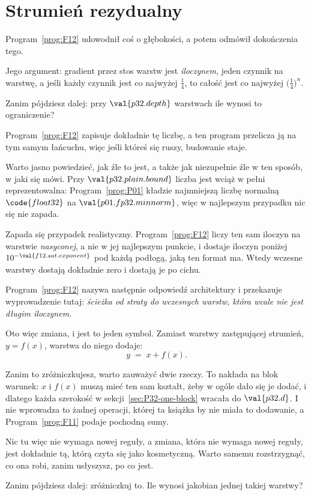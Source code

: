 \section{Strumień rezydualny}
\label{sec:P32-residual}

\begin{fr}
Program~\ref{prog:F12} udowodnił coś o głębokości, a potem odmówił dokończenia
tego.

Jego argument: gradient przez stos warstw jest \emph{iloczynem}, jeden
czynnik na warstwę, a jeśli każdy czynnik jest co najwyżej $\frac{1}{4}$, to
całość jest co najwyżej $\bigl(\frac{1}{4}\bigr)^{n}$.

Zanim pójdziesz dalej: przy $\val{p32.depth}$ warstwach ile wynosi to
ograniczenie?
\dotline
\nextframe
\end{fr}

\begin{fr}

Program~\ref{prog:F12} zapisuje dokładnie tę liczbę, a ten program przelicza
ją na tym samym łańcuchu, więc jeśli któreś się ruszy, budowanie staje.

Warto jasno powiedzieć, jak źle to jest, a także jak niezupełnie źle w ten
sposób, w jaki się mówi. Przy $\val{p32.plain.bound}$ liczba jest wciąż w
pełni reprezentowalna: Program~\ref{prog:P01} kładzie najmniejszą liczbę
normalną $\code{float32}$ na $\val{p01.fp32.minnorm}$, więc w najlepszym
przypadku nic się nie zapada.

Zapada się przypadek realistyczny. Program~\ref{prog:F12} liczy ten sam
iloczyn na warstwie \emph{nasyconej}, a nie w jej najlepszym punkcie, i
dostaje iloczyn poniżej $10^{-\val{f12.sat.exponent}}$ \dash{} pod każdą
podłogą, jaką ten format ma. Wtedy wczesne warstwy dostają dokładnie zero i
dostają je po cichu.

Program~\ref{prog:F12} nazywa następnie odpowiedź architektury i przekazuje
wyprowadzenie tutaj: \emph{ścieżka od straty do wczesnych warstw, która wcale
nie jest długim iloczynem.}

Oto więc zmiana, i jest to jeden symbol. Zamiast warstwy zastępującej
strumień, $y = f(x)$, warstwa do niego dodaje:
\[ y \;=\; x + f(x). \]

Zanim to zróżniczkujesz, warto zauważyć dwie rzeczy. To nakłada na blok
warunek: $x$ i $f(x)$ muszą mieć ten sam kształt, żeby w ogóle dało się je
dodać, i dlatego każda szerokość w
sekcji~\ref{sec:P32-one-block} wracała do $\val{p32.d}$. I nie wprowadza to
żadnej operacji, której ta książka by nie miała \dash{} to dodawanie, a
Program~\ref{prog:F11} podaje pochodną sumy.

Nic tu więc nie wymaga nowej reguły, a zmiana, która nie wymaga nowej reguły,
jest dokładnie tą, którą czyta się jako kosmetyczną. Warto samemu rozstrzygnąć,
co ona robi, zanim usłyszysz, po co jest.

Zanim pójdziesz dalej: zróżniczkuj to. Ile wynosi jakobian jednej takiej
warstwy?
\dotline
\nextframe
\end{fr}

